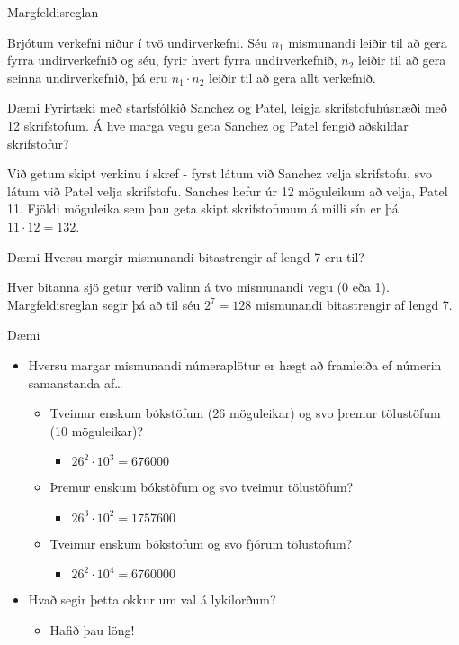 \documentclass[handout]{beamer}
\begin{document}
\begin{frame}{Margfeldisreglan}
\begin{tcolorbox}[title=Margfeldisreglan]
Brjótum verkefni niður í tvö undirverkefni. Séu $n_1$ mismunandi leiðir til að gera fyrra undirverkefnið og séu, fyrir hvert fyrra undirverkefnið, $n_2$ leiðir til að gera seinna undirverkefnið, þá eru $n_1 \cdot n_2$ leiðir til að gera allt verkefnið.
\end{tcolorbox}
\end{frame}

\begin{frame}{Dæmi}
Fyrirtæki með starfsfólkið Sanchez og Patel, leigja skrifstofuhúsnæði með 12 skrifstofum. Á hve marga vegu geta Sanchez og Patel fengið aðskildar skrifstofur?
\pause

\vspace{1cm}
Við getum skipt verkinu í skref - fyrst látum við Sanchez velja skrifstofu, svo látum við Patel velja skrifstofu. Sanches hefur úr 12 möguleikum að velja, Patel 11. Fjöldi möguleika sem þau geta skipt skrifstofunum á milli sín er þá $11 \cdot 12 = 132$.
\end{frame}

\begin{frame}{Dæmi}
Hversu margir mismunandi bitastrengir af lengd 7 eru til?
\pause

\vspace{1cm}
Hver bitanna sjö getur verið valinn á tvo mismunandi vegu (0 eða 1). Margfeldisreglan segir þá að til séu $2^7 = 128$ mismunandi bitastrengir af lengd 7.
\end{frame}

\begin{frame}{Dæmi}
\begin{itemize}
 \item Hversu margar mismunandi númeraplötur er hægt að framleiða ef númerin samanstanda af\ldots
 \begin{itemize}
  \item Tveimur enskum bókstöfum (26 möguleikar) og svo þremur tölustöfum (10 möguleikar)? \pause
  \begin{itemize}
   \item $26^2 \cdot 10^3 = 676000$
  \end{itemize}
  \item Þremur enskum bókstöfum og svo tveimur tölustöfum? \pause
  \begin{itemize}
   \item $26^3 \cdot 10^2 = 1757600$
  \end{itemize}
  \item Tveimur enskum bókstöfum og svo fjórum tölustöfum? \pause
  \begin{itemize}
   \item $26^2 \cdot 10^4 = 6760000$
  \end{itemize}
 \end{itemize}
 \item Hvað segir þetta okkur um val á lykilorðum? \pause
 \begin{itemize}
  \item Hafið þau löng!
 \end{itemize}
\end{itemize}
\end{frame}
\end{document}
